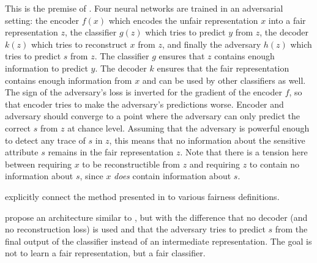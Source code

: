 This is the premise of \citet{edwards2016censoring}.
Four neural networks are trained in an adversarial setting:
the encoder \(f(x)\) which encodes the unfair representation \(x\) into a fair representation \(z\),
the classifier \(g(z)\) which tries to predict \(y\) from \(z\),
the decoder \(k(z)\) which tries to reconstruct \(x\) from \(z\),
and finally the adversary \(h(z)\) which tries to predict \(s\) from \(z\).
The classifier \(g\) ensures that \(z\) contains enough information to predict \(y\).
The decoder \(k\) ensures that the fair representation contains enough information from \(x\)
and can be used by other classifiers as well.
The sign of the adversary's loss is inverted for the gradient of the encoder \(f\),
so that encoder tries to make the adversary's predictions worse.
Encoder and adversary should converge to a point
where the adversary can only predict the correct \(s\) from \(z\) at chance level.
Assuming that the adversary is powerful enough to detect any trace of \(s\) in \(z\),
this means that no information about the sensitive attribute \(s\) remains in the fair representation \(z\).
Note that there is a tension here between requiring \(x\) to be reconstructible from \(z\)
and requiring \(z\) to contain no information about \(s\), since \(x\) \emph{does} contain information about \(s\).

\citet{beutel2017data} explicitly connect the method presented in \citet{edwards2016censoring}
to various fairness definitions.

\citet{zhang2018mitigating} propose an architecture similar to \citet{edwards2016censoring},
but with the difference that no decoder (and no reconstruction loss) is used
and that the adversary tries to predict \(s\) from the final output of the classifier
instead of an intermediate representation.
The goal is not to learn a fair representation, but a fair classifier.

